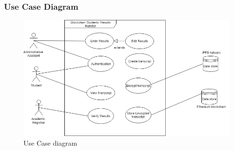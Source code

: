 \subsubsection{Use Case Diagram}
\begin{figure}[H]
\includegraphics[scale=0.5]{images/UseCaseDiagram.png}
\caption{Use Case diagram}
\end{figure}

